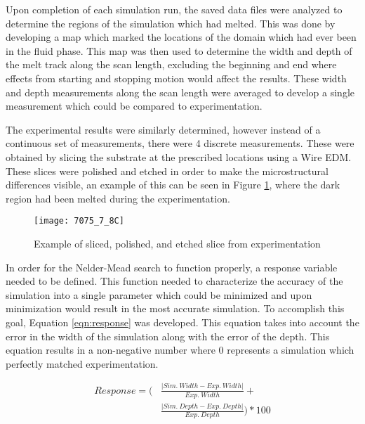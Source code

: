 \label{sim_analysis}

Upon completion of each simulation run, the saved data files were analyzed to determine the regions of the simulation which had melted.  This was done by developing a map which marked the locations of the domain which had ever been in the fluid phase.  This map was then used to determine the width and depth of the melt track along the scan length, excluding the beginning and end where effects from starting and stopping motion would affect the results.  These width and depth measurements along the scan length were averaged to develop a single measurement which could be compared to experimentation.  

The experimental results were similarly determined, however instead of a continuous set of measurements, there were 4 discrete measurements.  These were obtained by slicing the substrate at the prescribed locations using a Wire \ac{EDM}.  These slices were polished and etched in order to make the microstructural differences visible, an example of this can be seen in Figure \ref{fig:7075_7_8C}, where the dark region had been melted during the experimentation.
\begin{figure}[!htb]
	\centering
	\texttt{[image: 7075\_7\_8C]}
	\caption{Example of sliced, polished, and etched slice from experimentation}
	\label{fig:7075_7_8C}
\end{figure}

In order for the Nelder-Mead search to function properly, a response variable needed to be defined.  This function needed to characterize the accuracy of the simulation into a single parameter which could be minimized and upon minimization would result in the most accurate simulation.  To accomplish this goal, Equation \ref{eqn:response} was developed.  This equation takes into account the error in the width of the simulation along with the error of the depth.  This equation results in a non-negative number where 0 represents a simulation which perfectly matched experimentation.

\begin{equation}\label{eqn:response}
	\begin{split}
		Response =  \Biggl ( &\frac{\lvert Sim.\ Width - Exp.\ Width \rvert}{Exp.\ Width} + \\ 
		&\frac{\lvert Sim.\ Depth - Exp.\ Depth \rvert}{Exp.\ Depth} \Biggr ) * 100
	\end{split}
\end{equation}